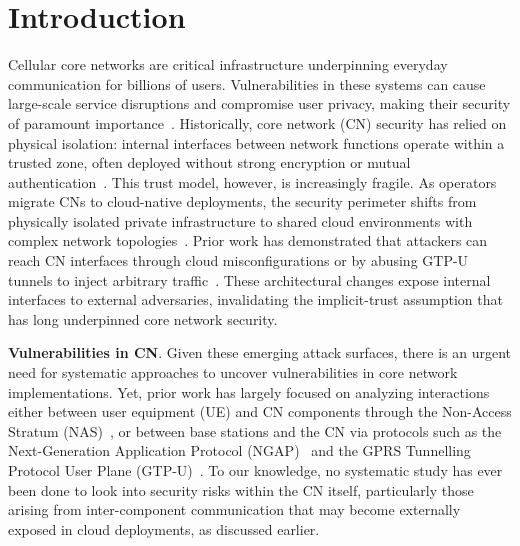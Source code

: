 
\section{Introduction}

Cellular core networks are critical infrastructure underpinning everyday communication for billions of users.
Vulnerabilities in these systems can cause large-scale service disruptions and compromise user privacy, making their security of paramount importance~\cite{son2025citesting}.
Historically, core network (CN) security has relied on physical isolation: internal interfaces between network functions operate within a trusted zone, often deployed without strong encryption or mutual authentication~\cite{3gpp33210}.
This trust model, however, is increasingly fragile. As operators migrate CNs to cloud-native deployments, the security perimeter shifts from physically isolated private infrastructure to shared cloud environments with complex network topologies~\cite{barrachina2022cloud}.
Prior work has demonstrated that attackers can reach CN interfaces through cloud misconfigurations or by abusing GTP-U tunnels to inject arbitrary traffic~\cite{zhang2025invade}.
These architectural changes expose internal interfaces to external adversaries, invalidating the implicit-trust assumption that has long underpinned core network security.

\vspace{2pt}\noindent\textbf{Vulnerabilities in CN}. Given these emerging attack surfaces, there is an urgent need for systematic approaches to uncover vulnerabilities in core network implementations. Yet, prior work has largely focused on analyzing interactions either between user equipment (UE) and CN components through the Non-Access Stratum (NAS)~\cite{garbelini2022towards, khandker2024astra, sun20255gc, dong2025corecrisis,bennett2024ransacked}, or between base stations and the CN via protocols such as the Next-Generation Application Protocol (NGAP)~\cite{sun20255gc,bennett2024ransacked} and the GPRS Tunnelling Protocol User Plane (GTP-U)~\cite{bennett2024ransacked}. To our knowledge, no systematic study has ever been done to look into security risks within the CN itself, particularly those arising from inter-component communication that may become externally exposed in cloud deployments, as discussed earlier.

